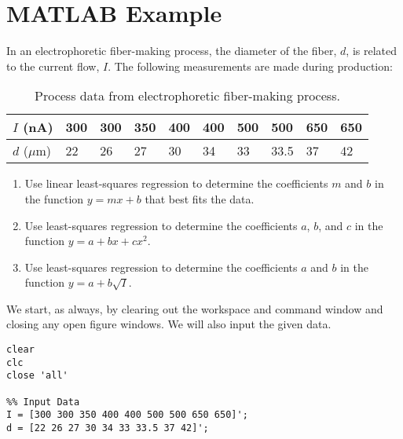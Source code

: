 \section{MATLAB Example}

In an electrophoretic fiber-making process, the diameter of the fiber, $d$, is related to the current flow, $I$.  The following measurements are made during production:
\begin{table}[h!]
\begin{tabular}{|l|l|l|l|l|l|l|l|l|l|}
\hline
$I$ (nA) & 300 & 300 & 350 & 400 & 400 & 500 & 500 & 650 & 650 \\ \hline
$d$ ($\mu$m) & 22 & 26 & 27 & 30 & 34 & 33 & 33.5 & 37 & 42 \\ \hline
\end{tabular}
\caption{Process data from electrophoretic fiber-making process.}
\end{table}

\begin{enumerate}
\item Use linear least-squares regression to determine the coefficients $m$ and $b$ in the function $y=mx+b$ that best fits the data.
\item Use least-squares regression to determine the coefficients $a$, $b$, and $c$ in the function $y = a + bx + cx^2$.
\item Use least-squares regression to determine the coefficients $a$ and $b$ in the function $y = a + b\sqrt{I}$.
\end{enumerate}

We start, as always, by clearing out the workspace and command window and closing any open figure windows.  We will also input the given data.
\begin{lstlisting}[style=myMatlab,name=lec13n-ex1]
clear
clc
close 'all'

%% Input Data
I = [300 300 350 400 400 500 500 650 650]';
d = [22 26 27 30 34 33 33.5 37 42]';

\end{lstlisting}

